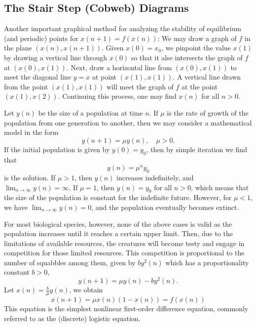 \subsection{The Stair Step (Cobweb) Diagrams}

Another important graphical method for analyzing the stability of equilibrium (and periodic) points for $x(n+1)=f(x(n))$: We may draw a graph of $f$ in the plane $(x(n),x(n+1))$. Given $x(0)=x_0$, we pinpoint the value $x(1)$ by drawing a vertical line through $x(0)$ so that it alse intersects the graph of $f$ at $(x(0),x(1))$. Next, draw a horizontal line from $(x(0),x(1))$ to meet the diagonal line $y=x$ at point $(x(1),x(1))$. A vertical line drawn from the point $(x(1),x(1))$ will meet the graph of $f$ at the point $(x(1),x(2))$. Continuing this process, one may find $x(n)$ for all $n>0$.

\begin{eg}
    Let $y(n)$ be the size of a population at time $n$. If $\mu$ is the rate of growth of the population from one generation to another, then we may consider a mathematical model in the form
    \[
        y(n+1)=\mu y(n),\quad\mu>0.
    \]
    If the initial population is given by $y(0)=y_0$, then by simple iteration we find that
    \[
        y(n)=\mu^n y_0
    \]
    is the solution. If $\mu>1$, then $y(n)$ increases indefinitely, and $\lim_{n\to\infty}y(n)=\infty$. If $\mu=1$, then $y(n)=y_0$ for all $n>0$, which means that the size of the population is constant for the indefinite future. However, for $\mu<1$, we have $\lim_{n\to\infty}y(n)=0$, and the population eventually becomes extinct.

    For most biological species, however, none of the above cases is valid as the population increases until it reaches a certain upper limit. Then, due to the limitations of available resources, the creatures will become testy and engage in competition for those limited resources. This competition is proportional to the number of squabbles among them, given by $by^2(n)$ which has a proportionality constant $b>0$,
    \[
        y(n+1)=\mu y(n)-by^2(n).
    \]
    Let $x(n)=\frac{b}{\mu}y(n)$, we obtain
    \[
        x(n+1)=\mu x(n)(1-x(n))=f(x(n))
    \]
    This equation is the simplest nonlinear first-order difference equation, commonly referred to as the (discrete) logistic equation.
\end{eg}
